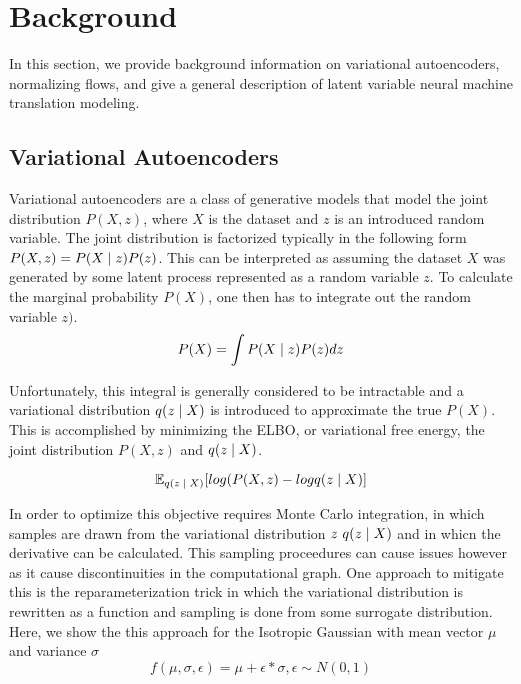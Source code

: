 \chapter{Background}

In this section, we provide background information on variational autoencoders, normalizing flows, and give a general description of latent variable neural machine translation modeling. 

\section{Variational Autoencoders}

Variational autoencoders are a class of generative models that model the joint distribution $P(X, z)$, where $X$ is the dataset and $z$ is an introduced random variable. The joint distribution is factorized typically in the following form $P(X, z) = P(X\; | \;{z})P(z)$. This can be interpreted as assuming the dataset $X$ was generated by some latent process represented as a random variable $z$. To calculate the marginal probability $P(X)$, one then has to integrate out the random variable $z)$.
\begin{equation}
	P(X) = \int P(X \; | \;{z}) P(z) dz
\end{equation}

Unfortunately, this integral is generally considered to be intractable and a variational distribution $q(z \; | \;{X})$ is introduced to approximate the true $P(X)$. This is accomplished by minimizing the \ac{ELBO}, or variational free energy, the joint distribution $P(X, z)$ and $q(z \; | \;{X})$. 

\begin{equation}
	\operatorname{\mathbb{E}}_{q(z \; | \;{X})} [ log(P(X, z) - log q(z \; | \;{X})] 
\end{equation}


In order to optimize this objective requires Monte Carlo integration, in which samples are drawn from the variational distribution $z ~ q(z \; | \;{X})$ and in whicn the derivative can be calculated. This sampling proceedures can cause issues however as it cause discontinuities in the computational graph. One approach to mitigate this is the reparameterization trick \cite{kingma2014autoencodingVB,rezende2014stochasticBackprop} in which the variational distribution  is rewritten as a function and sampling is done from some surrogate distribution. Here, we show the this approach for the Isotropic Gaussian with mean vector $\mu$ and variance $\sigma$
\begin{equation}
	f(\mu, \sigma, \epsilon) = \mu + \epsilon * \sigma, \epsilon \sim N(0, 1)
\end{equation}

